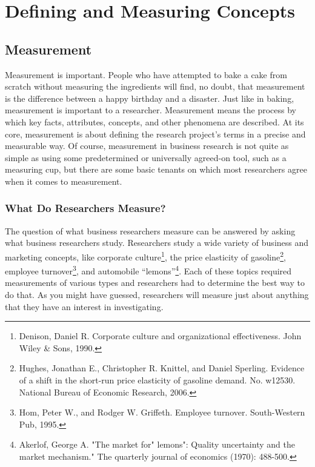 \chapter{Defining and Measuring Concepts}\label{ch05:measuring}

\section{Measurement}

Measurement is important. People who have attempted to bake a cake from scratch without measuring the ingredients will find, no doubt, that measurement is the difference between a happy birthday and a disaster. Just like in baking, measurement is important to a researcher. Measurement means the process by which key facts, attributes, concepts, and other phenomena are described. At its core, measurement is about defining the research project's terms in a precise and measurable way. Of course, measurement in business research is not quite as simple as using some predetermined or universally agreed-on tool, such as a measuring cup, but there are some basic tenants on which most researchers agree when it comes to measurement. 

\subsection{What Do Researchers Measure?}

The question of what business researchers measure can be answered by asking what business researchers study. Researchers study a wide variety of business and marketing concepts, like corporate culture\footnote{Denison, Daniel R. Corporate culture and organizational effectiveness. John Wiley \& Sons, 1990.}, the price elasticity of gasoline\footnote{Hughes, Jonathan E., Christopher R. Knittel, and Daniel Sperling. Evidence of a shift in the short-run price elasticity of gasoline demand. No. w12530. National Bureau of Economic Research, 2006.}, employee turnover\footnote{Hom, Peter W., and Rodger W. Griffeth. Employee turnover. South-Western Pub, 1995.}, and automobile ``lemons''\footnote{Akerlof, George A. "The market for" lemons": Quality uncertainty and the market mechanism." The quarterly journal of economics (1970): 488-500.}. Each of these topics required measurements of various types and researchers had to determine the best way to do that. As you might have guessed, researchers will measure just about anything that they have an interest in investigating. 

